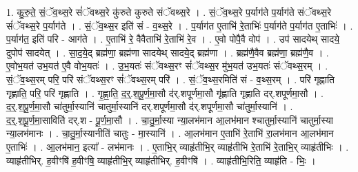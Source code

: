 \documentclass[17pt]{extarticle}
\begin{document}
1. कु॒रु॒ते॒ सं॒ॅव॒थ्स॒रे सं॑ॅवथ्स॒रे कु॑रुते कुरुते संॅवथ्स॒रे । . सं॒ॅव॒थ्स॒रे प॒र्याग॑ते प॒र्याग॑ते संॅवथ्स॒रे सं॑ॅवथ्स॒रे प॒र्याग॑ते । . सं॒ॅव॒थ्स॒र इति॑ सं - व॒थ्स॒रे । . प॒र्याग॑त ए॒ताभि॑ रे॒ताभिः॑ प॒र्याग॑ते प॒र्याग॑त ए॒ताभिः॑ । . प॒र्याग॑त॒ इति॑ परि - आग॑ते । . ए॒ताभि॑ रे॒ वैवैताभि॑ रे॒ताभि॑ रे॒व । . ए॒वो पोपै॒वै वोप॑ । . उप॑ सादयेथ् सादये॒ दुपोप॑ सादयेत् । . सा॒द॒ये॒द् ब्रह्म॑णा॒ ब्रह्म॑णा सादयेथ् सादये॒द् ब्रह्म॑णा । . ब्रह्म॑णै॒वैव ब्रह्म॑णा॒ ब्रह्म॑णै॒व । . ए॒वोभ॒यत॑ उभ॒यत॑ ए॒वै वोभ॒यतः॑ । . उ॒भ॒यतः॑ संॅवथ्स॒रꣳ सं॑ॅवथ्स॒र मु॑भ॒यत॑ उभ॒यतः॑ संॅवथ्स॒रम् । . सं॒ॅव॒थ्स॒रम् परि॒ परि॑ संॅवथ्स॒रꣳ सं॑ॅवथ्स॒रम् परि॑ । . सं॒ॅव॒थ्स॒रमिति॑ सं - व॒थ्स॒रम् । . परि॑ गृह्णाति गृह्णाति॒ परि॒ परि॑ गृह्णाति । . गृ॒ह्णा॒ति॒ द॒र्॒.श॒पू॒र्ण॒मा॒सौ द॑र्.शपूर्णमा॒सौ गृ॑ह्णाति गृह्णाति दर्.शपूर्णमा॒सौ । . द॒र्॒.श॒पू॒र्ण॒मा॒सौ चा॑तुर्मा॒स्यानि॑ चातुर्मा॒स्यानि॑ दर्.शपूर्णमा॒सौ द॑र्.शपूर्णमा॒सौ चा॑तुर्मा॒स्यानि॑ । . द॒र्॒.श॒पू॒र्ण॒मा॒साविति॑ दर्.श - पू॒र्ण॒मा॒सौ । . चा॒तु॒र्मा॒स्या न्या॒लभ॑मान आ॒लभ॑मान श्चातुर्मा॒स्यानि॑ चातुर्मा॒स्या न्या॒लभ॑मानः । . चा॒तु॒र्मा॒स्यानीति॑ चातुः - मा॒स्यानि॑ । . आ॒लभ॑मान ए॒ताभि॑ रे॒ताभि॑ रा॒लभ॑मान आ॒लभ॑मान ए॒ताभिः॑ । . आ॒लभ॑मान॒ इत्या᳚ - लभ॑मानः । . ए॒ताभि॒र् व्याहृ॑तीभि॒र् व्याहृ॑तीभि रे॒ताभि॑ रे॒ताभि॒र् व्याहृ॑तीभिः । . व्याहृ॑तीभिर्. ह॒वीꣳषि॑ ह॒वीꣳषि॒ व्याहृ॑तीभि॒र् व्याहृ॑तीभिर्. ह॒वीꣳषि॑ । . व्याहृ॑तीभि॒रिति॒ व्याहृ॑ति - भिः॒ । \newline
\end{document}
